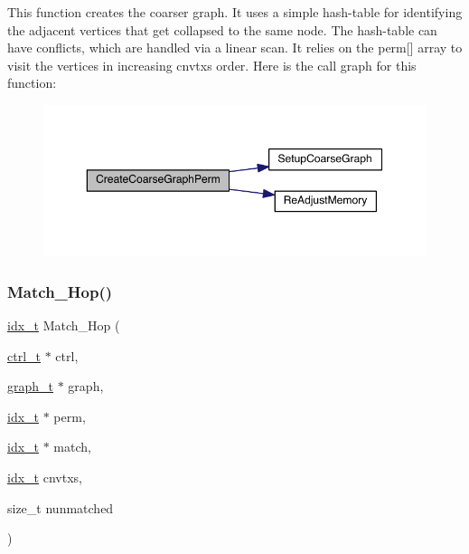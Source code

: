 This function creates the coarser graph. It uses a simple hash-\/table for identifying the adjacent vertices that get collapsed to the same node. The hash-\/table can have conflicts, which are handled via a linear scan. It relies on the perm\mbox{[}\mbox{]} array to visit the vertices in increasing cnvtxs order. Here is the call graph for this function\+:\nopagebreak
\begin{figure}[H]
\begin{center}
\leavevmode
\includegraphics[width=350pt]{a00182_a0aba484ba693edd6d56426d04bd7fd4b_cgraph}
\end{center}
\end{figure}
\mbox{\label{a00182_aead846b2c69509c914426ff087509934}} 
\subsubsection{\texorpdfstring{Match\+\_\+Hop()}{Match\_2Hop()}}
{\footnotesize\ttfamily \hyperlink{a00876_aaa5262be3e700770163401acb0150f52}{idx\+\_\+t} Match\+\_\+Hop (\begin{DoxyParamCaption}\item[{\hyperlink{a00742}{ctrl\+\_\+t} $\ast$}]{ctrl,  }\item[{\hyperlink{a00734}{graph\+\_\+t} $\ast$}]{graph,  }\item[{\hyperlink{a00876_aaa5262be3e700770163401acb0150f52}{idx\+\_\+t} $\ast$}]{perm,  }\item[{\hyperlink{a00876_aaa5262be3e700770163401acb0150f52}{idx\+\_\+t} $\ast$}]{match,  }\item[{\hyperlink{a00876_aaa5262be3e700770163401acb0150f52}{idx\+\_\+t}}]{cnvtxs,  }\item[{size\+\_\+t}]{nunmatched }\end{DoxyParamCaption})}

